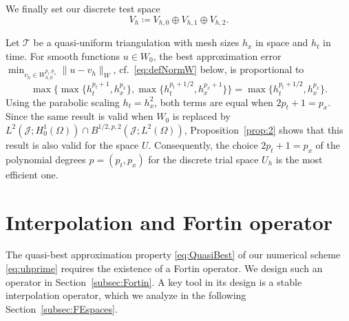\documentclass{amsart}
\providecommand{\tria}{\mathcal{T}}
\begin{document}
%
We finally set our discrete test space 
\begin{equation}\label{eq:testSpace}
V_h \coloneqq V_{h,0} \oplus V_{h,1} \oplus V_{h,2}.
\end{equation}
%
\begin{remark} \label{rem:1} 
Let $\tria$ be a quasi-uniform triangulation with mesh sizes $h_x$ in space and $h_t$ in time. For smooth functions $u \in W_0$, the best approximation error $\min_{v_h\in W_{h,0}^{p_t,p_x}} \lVert u - v_h \rVert_W$, cf.~\eqref{eq:defNormW} below, is proportional to 
\begin{equation*}
\max\big\lbrace \max\lbrace h_t^{p_t+1},h_x^{p_x}\rbrace,\max \lbrace h_t^{p_t+1/2},h_x^{p_x+1}\rbrace \big\rbrace =\max \lbrace h_t^{p_t+1/2},h_x^{p_x}\rbrace.
\end{equation*}
Using the parabolic scaling $h_t=h_x^2$, both terms are equal when $2 p_t+1=p_x$. 
Since the same result is valid when $W_0$ is replaced by $L^2(\mathcal{J} ;H^1_0(\Omega)) \cap B^{1/2,p,2}(\mathcal{J};L^2(\Omega))$, Proposition~\ref{prop:2} shows that this result is also valid for the space $U$. Consequently, the choice $2 p_t+1=p_x$ of the  polynomial degrees $p=(p_t,p_x)$ for the discrete trial space $U_h$  is the most efficient one.
\end{remark}

\section{Interpolation and Fortin operator} \label{sec:Interpol}
The quasi-best approximation property \eqref{eq:QuasiBest} of our numerical scheme \eqref{eq:uhprime} requires the existence of a Fortin operator. We design such an operator in Section~\ref{subsec:Fortin}. A key tool in its design is a stable interpolation operator, which we analyze in the following Section~\ref{subsec:FEspaces}.
%
\end{document}
